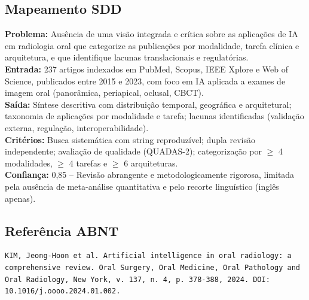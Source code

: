 \subsection{Mapeamento SDD}
\textbf{Problema:} Ausência de uma visão integrada e crítica sobre as
aplicações de IA em radiologia oral que categorize as publicações por
modalidade, tarefa clínica e arquitetura, e que identifique lacunas
translacionais e regulatórias. \\
\textbf{Entrada:} 237 artigos indexados em PubMed, Scopus, IEEE Xplore e
Web of Science, publicados entre 2015 e 2023, com foco em IA aplicada a
exames de imagem oral (panorâmica, periapical, oclusal, CBCT). \\
\textbf{Saída:} Síntese descritiva com distribuição temporal, geográfica
e arquitetural; taxonomia de aplicações por modalidade e tarefa; lacunas
identificadas (validação externa, regulação, interoperabilidade). \\
\textbf{Critérios:} Busca sistemática com string reproduzível; dupla
revisão independente; avaliação de qualidade (QUADAS-2); categorização
por $\geq$ 4 modalidades, $\geq$ 4 tarefas e $\geq$ 6 arquiteturas. \\
\textbf{Confiança:} 0,85 -- Revisão abrangente e metodologicamente
rigorosa, limitada pela ausência de meta-análise quantitativa e pelo
recorte linguístico (inglês apenas).

\subsection{Referência ABNT}
\begin{verbatim}
KIM, Jeong-Hoon et al. Artificial intelligence in oral radiology: a
comprehensive review. Oral Surgery, Oral Medicine, Oral Pathology and
Oral Radiology, New York, v. 137, n. 4, p. 378-388, 2024. DOI:
10.1016/j.oooo.2024.01.002.
\end{verbatim}
\endinput
